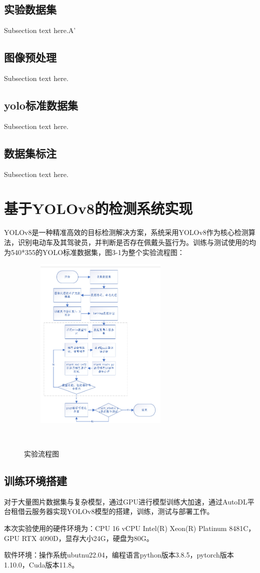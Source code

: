\documentclass[journal]{IEEEtran}
\numberwithin{figure}{section}%
\begin{document}
\subsection{实验数据集}
Subsection text here.A'
\subsection{图像预处理}
Subsection text here.
\subsection{yolo标准数据集}
Subsection text here.
\subsection{数据集标注}
Subsection text here.

\section{基于YOLOv8的检测系统实现}
YOLOv8是一种精准高效的目标检测解决方案，系统采用YOLOv8作为核心检测算法，识别电动车及其驾驶员，并判断是否存在佩戴头盔行为。训练与测试使用的均为540*355的YOLO标准数据集，图3-1为整个实验流程图：
\begin{figure}[htbp] 

   \centering
   \includegraphics[width=2.5in]{figures/流程图.png}
   \caption{实验流程图} 
   \label{fig:} 
  
\end{figure} 

\subsection{训练环境搭建}
对于大量图片数据集与复杂模型，通过GPU进行模型训练大加速，通过AutoDL平台租借云服务器实现YOLOv8模型的搭建，训练，测试与部署工作。\par
本次实验使用的硬件环境为：CPU 16 vCPU Intel(R) Xeon(R) Platinum 8481C，GPU RTX 4090D，显存大小24G，硬盘为80G。\par
软件环境：操作系统ubutnu22.04，编程语言python版本3.8.5，pytorch版本1.10.0，Cuda版本11.8。\par
\end{document}
